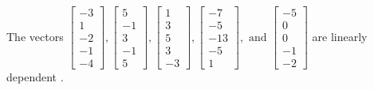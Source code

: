 \begin{exercise}
\begin{exerciseStatement}
  \end{exerciseStatement}
  \begin{exerciseAnswer}
   The vectors \(\left[\begin{array}{r}
-3 \\
1 \\
-2 \\
-1 \\
-4
\end{array}\right] , \left[\begin{array}{r}
5 \\
-1 \\
3 \\
-1 \\
5
\end{array}\right] , \left[\begin{array}{r}
1 \\
3 \\
5 \\
3 \\
-3
\end{array}\right] , \left[\begin{array}{r}
-7 \\
-5 \\
-13 \\
-5 \\
1
\end{array}\right] , \text{ and } \left[\begin{array}{r}
-5 \\
0 \\
0 \\
-1 \\
-2
\end{array}\right]\) are 
  	 linearly dependent  .
  


  \end{exerciseAnswer}
\end{exercise}